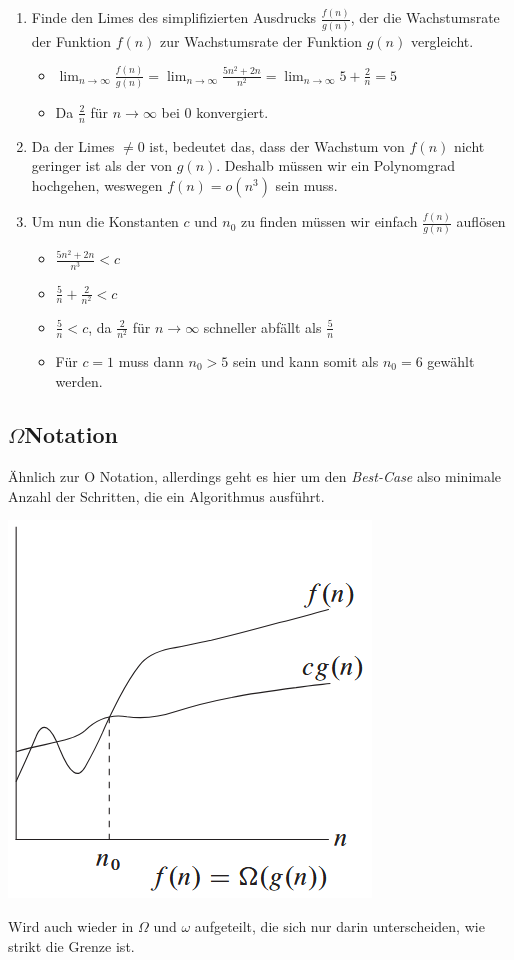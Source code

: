 \documentclass[ngerman,
color=3b,
load_common, %
boxarc,
main,
tikz,
border=3mm
]{article}
\begin{document}
\begin{enumerate}
    \item Finde den Limes des simplifizierten Ausdrucks $\frac{f(n)}{g(n)}$, der die Wachstumsrate der Funktion $f(n)$ zur Wachstumsrate der Funktion $g(n)$ vergleicht.
    \begin{itemize}
        \item $\lim_{n \to \infty} \frac{f(n)}{g(n)} = \lim_{n \to \infty} \frac{5n^2 + 2n}{n^2} = \lim_{n \to \infty} 5 + \frac{2}{n} = 5$
        \item Da $\frac{2}{n}$ für $n \to \infty$ bei 0 konvergiert.
    \end{itemize}
    \item Da der Limes $\not= 0$ ist, bedeutet das, dass der Wachstum von $f(n)$ nicht geringer ist als der von $g(n)$. Deshalb müssen wir ein Polynomgrad hochgehen, weswegen $f(n) = o(n^3)$ sein muss. 
    \item Um nun die Konstanten $c$ und $n_0$ zu finden müssen wir einfach $\frac{f(n)}{g(n)}$ auflösen
    \begin{itemize}
        \item $\frac{5n^2 + 2n}{n^3} < c$
        \item $\frac{5}{n} + \frac{2}{n^2} < c$
        \item $\frac{5}{n} < c$, da $\frac{2}{n^2}$ für $n \to \infty$ schneller abfällt als $\frac{5}{n}$
        \item Für $c = 1$ muss dann $n_0 > 5$ sein und kann somit als $n_0 = 6$ gewählt werden.
    \end{itemize}
\end{enumerate}

\newpage
\subsection{$\Omega$\space Notation}
Ähnlich zur O Notation, allerdings geht es hier um den \textit{Best-Case} also minimale Anzahl der Schritten, die ein Algorithmus ausführt.
\begin{center}
    \includegraphics[scale=0.6]{Pics/OmegaNotation.png}
\end{center}
Wird auch wieder in $\Omega$ und $\omega$ aufgeteilt, die sich nur darin unterscheiden, wie strikt die Grenze ist.
\end{document}
